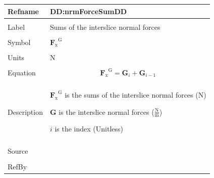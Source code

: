 \documentclass[12pt]{article}
\begin{document}
\vspace{\baselineskip}
\noindent
\begin{minipage}{\textwidth}
\begin{tabular}{>{\raggedright}p{}>{\raggedright\arraybackslash}p{}}
\toprule \textbf{Refname} & \textbf{DD:nrmForceSumDD}
\label{DD:nrmForceSumDD}
\\ \midrule \\
Label & Sums of the interslice normal forces
        
\\ \midrule \\
Symbol & ${{\mathbf{F}_{\text{x}}}^{\text{G}}}$
         
\\ \midrule \\
Units & N
        
\\ \midrule \\
Equation & \begin{displaymath}
           {{\mathbf{F}_{\text{x}}}^{\text{G}}}={\mathbf{G}}_{i}+{\mathbf{G}}_{i-1}
           \end{displaymath}
\\ \midrule \\
Description & \begin{symbDescription}
              \item{${{\mathbf{F}_{\text{x}}}^{\text{G}}}$ is the sums of the interslice normal forces (N)}
              \item{$\mathbf{G}$ is the interslice normal forces ($\frac{\text{N}}{\text{m}}$)}
              \item{$i$ is the index (Unitless)}
              \end{symbDescription}
\\ \midrule \\
Source & \cite{fredlund1977}
         
\\ \midrule \\
RefBy & 
\\ \bottomrule
\end{tabular}
\end{minipage}
\end{document}
